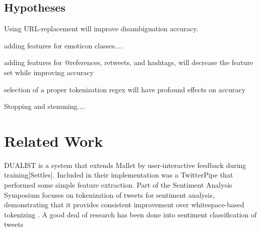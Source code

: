 \documentclass[letterpaper]{article}
\begin{document}
\subsection{Hypotheses}
\item Using URL-replacement will improve disambiguation accuracy. 
\item adding features for emoticon classes....
\item adding features for @references, retweets, and hashtags, will decrease the feature set while improving accuracy
\item selection of a proper tokenization regex will have profound effects on accuracy
\item Stopping and stemming....

\section{Related Work}
DUALIST is a system that extends Mallet by user-interactive feedback during training[Settles]. Included in their implementation was a TwitterPipe that performed some simple feature extraction. 
Part of the Sentiment Analysis Symposium focuses on tokenization of tweets for sentiment analysis, demonstrating that it provides consistent improvement over whitespace-based tokenizing \cite{potts2011}. A good deal of research has been done into sentiment classification of tweets \cite{Pak10}
\end{document}
